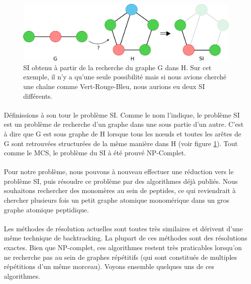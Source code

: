 \documentclass[12pt,french,twoside]{report}
\begin{document}
\begin{figure}[!ht]
  \begin{center}
    \includegraphics[width=450px]{Figures/s2m/MCS-SI/si.png}
    \caption{\label{SI_fig}SI obtenu à partir de la recherche du graphe G dans H.
    Sur cet exemple, il n'y a qu'une seule possibilité mais si nous avions cherché une chaîne comme Vert-Rouge-Bleu, nous aurions eu deux SI différents.}
  \end{center}
\end{figure}

\paragraph{}Définissions à son tour le problème SI.
Comme le nom l'indique, le problème SI est un problème de recherche d'un graphe dans une sous partie d'un autre.
C'est à dire que G est sous graphe de H lorsque tous les n\oe{}uds et toutes les arêtes de G sont retrouvées structurées de la même manière dans H (voir figure \ref{SI_fig}).
Tout comme le MCS, le problème du SI à été prouvé NP-Complet\cite{garey_computers_1979}.

\paragraph{}Pour notre problème, nous pouvons à nouveau effectuer une réduction vers le problème SI, puis résoudre ce problème par des algorithmes déjà publiés.
Nous souhaitons rechercher des monomères au sein de peptides, ce qui reviendrait à chercher plusieurs fois un petit graphe atomique monomérique dans un gros graphe atomique peptidique.

\paragraph{}Les méthodes de résolution actuelles sont toutes très similaires et dérivent d'une même technique de backtracking.
La plupart de ces méthodes sont des résolutions exactes.
Bien que NP-complet, ces algorithmes restent très praticables lorsqu'on ne recherche pas au sein de graphes répétitifs (qui sont constitués de multiples répétitions d'un même morceau).
Voyons ensemble quelques uns de ces algorithmes.
\end{document}
